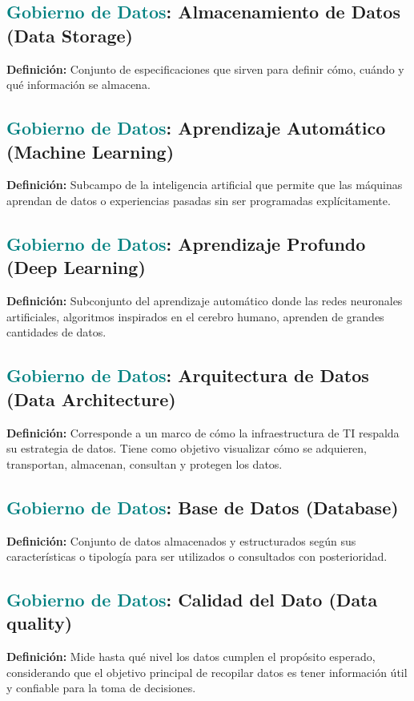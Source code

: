 \documentclass[12pt]{article}
\begin{document}
\subsection{\textcolor{teal}{Gobierno de Datos}: Almacenamiento de Datos (Data Storage)}
\textbf{Definición:} Conjunto de especificaciones que sirven para definir cómo, cuándo y qué información se almacena.
\subsection{\textcolor{teal}{Gobierno de Datos}: Aprendizaje Automático (Machine Learning)}
\textbf{Definición:} Subcampo de la inteligencia artificial que permite que las máquinas aprendan de datos o experiencias pasadas sin ser programadas explícitamente.
\subsection{\textcolor{teal}{Gobierno de Datos}: Aprendizaje Profundo (Deep Learning)}
\textbf{Definición:} Subconjunto del aprendizaje automático donde las redes neuronales artificiales, algoritmos inspirados en el cerebro humano, aprenden de grandes cantidades de datos.
\subsection{\textcolor{teal}{Gobierno de Datos}: Arquitectura de Datos (Data Architecture)}
\textbf{Definición:} Corresponde a un marco de cómo la infraestructura de TI respalda su estrategia de datos. Tiene como objetivo visualizar cómo se adquieren, transportan, almacenan, consultan y protegen los datos.
\subsection{\textcolor{teal}{Gobierno de Datos}: Base de Datos (Database)}
\textbf{Definición:} Conjunto de datos almacenados y estructurados según sus características o tipología para ser utilizados o consultados con posterioridad.
\subsection{\textcolor{teal}{Gobierno de Datos}: Calidad del Dato (Data quality)}
\textbf{Definición:} Mide hasta qué nivel los datos cumplen el propósito esperado, considerando que el objetivo principal de recopilar datos es tener información útil y confiable para la toma de decisiones.
\end{document}
